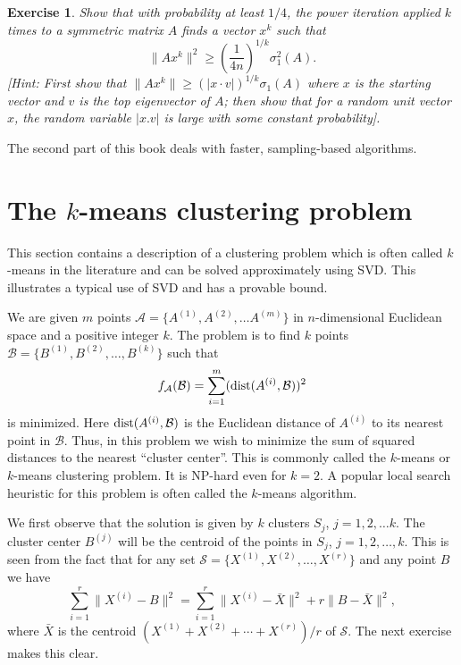\documentclass{book}
\newtheorem{exercise}{Exercise}
\numberwithin{exercise}{chapter}
\begin{document}
\begin{exercise}
Show that with probability at least $1/4$, the power iteration applied $k$ times to a symmetric matrix $A$ finds a vector $x^k$ such that
\[
\|Ax^k\|^2 \ge \left(\frac{1}{4n}\right)^{1/k} \sigma_1^2(A).
\]
[Hint: First show that $\|Ax^k\| \ge (|x \cdot v|)^{1/k}\sigma_1(A)$ where $x$ is the starting vector and $v$ is the top eigenvector of $A$; then show that for a random unit
vector $x$, the random variable $|x.v|$ is large with some constant probability].
\end{exercise}

The second part of this book deals with faster, sampling-based algorithms.

\section{The $k$-means clustering problem}

This section contains a description of a clustering problem which is often called $k$-means in the literature and
can be solved approximately using SVD. This illustrates a
typical use of SVD and has a provable bound.

We are given $m$ points ${\mathcal A}=\{A^{(1)},A^{(2)},\ldots A^{(m)}\}$
in $n$-dimensional Euclidean space and a positive integer $k$.
The problem is to find $k$ points
${\mathcal B}=\{B^{(1)},B^{(2)},\ldots,B^{(k)}\}$ such that
$$f_{{\mathcal A}}({\mathcal B}) = \sum_{i=1}^m (\hbox{dist}(A^{(i)},{\mathcal B}))^2$$
is minimized. Here $\hbox{dist}(A^{(i)},{\mathcal B})$
is the Euclidean distance of $A^{(i)}$ to its nearest point in ${\mathcal B}$. Thus,
in this problem we wish to minimize the sum of squared distances to the nearest
``cluster center''.  This is commonly called the $k$-means or $k$-means clustering problem.
It is NP-hard even for $k=2$. A popular local search heuristic for this problem is often called the $k$-means algorithm.

We first observe that the solution is given by $k$ clusters $S_j$, $j=1,2,\ldots k$. The
cluster center $B^{(j)}$ will be the centroid
of the points in $S_j$, $j=1,2,\ldots,k$. This is seen from the fact that for any set
${\mathcal S}=\{X^{(1)},X^{(2)},\ldots,X^{(r)}\}$ and any point $B$ we have
\begin{equation}\label{99}
\sum_{i=1}^r \|X^{(i)}-B\|^2=\sum_{i=1}^r \|X^{(i)}-\bar{X}\|^2+r\|B-\bar{X}\|^2,
\end{equation}
where $\bar{X}$ is the centroid $(X^{(1)}+X^{(2)}+\cdots+X^{(r)})/r$ of ${\mathcal S}$. The next exercise makes this clear.
\end{document}
